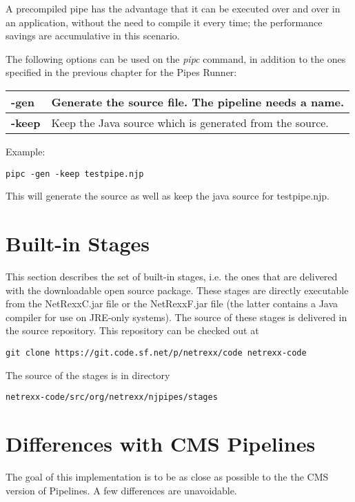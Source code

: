 A precompiled pipe has
the advantage that it can be executed over and over in an application,
without the need to compile it every time; the performance savings are
accumulative in this scenario.

The following options can be used on the \emph{pipc} command, in
addition to the ones specified in the previous chapter for the Pipes Runner:

\begin{tabularx}{\textwidth}{>{\bfseries}lX}
\toprule
-gen&Generate the \nr{} source file. The pipeline needs a name.
\\\midrule
-keep&Keep the Java source which is generated from the \nr{} source.
\\\bottomrule
\end{tabularx}

Example:
\begin{lstlisting}
pipc -gen -keep testpipe.njp
\end{lstlisting}
This will generate the \nr{} source as well as keep the java source for testpipe.njp.


\chapter{Built-in Stages} \label{BuiltinStages} 
This section describes the set of built-in stages, i.e. the ones that
are delivered with the downloadable open source package. These stages
are directly executable from the NetRexxC.jar file or the NetRexxF.jar
file (the latter contains a Java compiler for use on JRE-only
systems).
The source of these stages is delivered in the \nr{}
source repository. This repository can be checked out at
\begin{lstlisting}
git clone https://git.code.sf.net/p/netrexx/code netrexx-code
\end{lstlisting}
The source of the stages is in directory
\begin{lstlisting}
netrexx-code/src/org/netrexx/njpipes/stages
\end{lstlisting}




\chapter{Differences with CMS Pipelines}
The goal of this implementation is to be as close as possible to the
the CMS version of Pipelines. A few differences are unavoidable.

